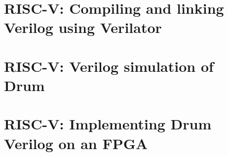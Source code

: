 \section{RISC-V: Compiling and linking Verilog using Verilator}

\label{Sec_FSMs_Drum_verilator}


\section{RISC-V: Verilog simulation of Drum}

\label{Sec_FSMs_Drum_simulation}


\section{RISC-V: Implementing Drum Verilog on an FPGA}

\label{Sec_FSMs_Drum_FPGA}

